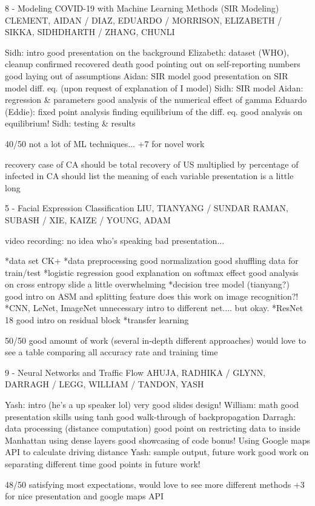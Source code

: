 8 - Modeling COVID-19 with Machine Learning Methods (SIR Modeling)
CLEMENT, AIDAN / DIAZ, EDUARDO / MORRISON, ELIZABETH / SIKKA, SIDHDHARTH / ZHANG, CHUNLI

Sidh: intro
good presentation on the background
Elizabeth: dataset (WHO), cleanup
confirmed recovered death
good pointing out on self-reporting numbers
good laying out of assumptions
Aidan: SIR model
good presentation on SIR model diff. eq.
(upon request of explanation of I model) Sidh: SIR model
Aidan: regression & parameters
good analysis of the numerical effect of gamma
Eduardo (Eddie): fixed point analysis
finding equilibrium of the diff. eq.
good analysis on equilibrium!
Sidh: testing & results


40/50 not a lot of ML techniques... +7 for novel work

recovery case of CA should be total recovery of US multiplied by percentage of infected in CA
should list the meaning of each variable
presentation is a little long


5 - Facial Expression Classification
LIU, TIANYANG / SUNDAR RAMAN, SUBASH / XIE, KAIZE / YOUNG, ADAM

video recording: no idea who's speaking
bad presentation...

*data set CK+
*data preprocessing
good normalization
good shuffling data for train/test
*logistic regression
good explanation on softmax effect
good analysis on cross entropy
slide a little overwhelming
*decision tree model (tianyang?)
good intro on ASM and splitting feature
does this work on image recognition?!
*CNN, LeNet, ImageNet
unnecessary intro to different net.... but okay.
*ResNet 18
good intro on residual block
*transfer learning

50/50 good amount of work (several in-depth different approaches)
would love to see a table comparing all accuracy rate and training time

9 - Neural Networks and Traffic Flow
AHUJA, RADHIKA / GLYNN, DARRAGH / LEGG, WILLIAM / TANDON, YASH

Yash: intro
(he's a up speaker lol)
very good slides design!
William: math
good presentation skills
using tanh
good walk-through of backpropagation
Darragh: data processing (distance computation)
good point on restricting data to inside Manhattan
using dense layers
good showcasing of code
bonus! Using Google maps API to calculate driving distance
Yash: sample output, future work
good work on separating different time 
good points in future work!

48/50 satisfying most expectations, would love to see more different methods +3 for nice presentation and google maps API

